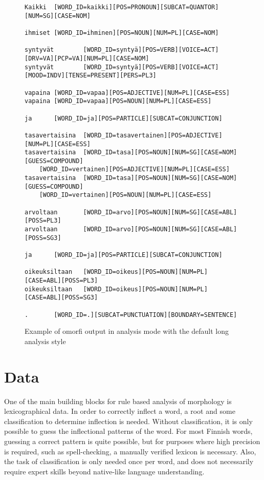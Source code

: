 \documentclass[a4paper,12pt]{article}
\begin{document}
\begin{figure}
    \begin{scriptsize}
\begin{verbatim}
Kaikki  [WORD_ID=kaikki][POS=PRONOUN][SUBCAT=QUANTOR][NUM=SG][CASE=NOM]

ihmiset [WORD_ID=ihminen][POS=NOUN][NUM=PL][CASE=NOM]

syntyvät        [WORD_ID=syntyä][POS=VERB][VOICE=ACT][DRV=VA][PCP=VA][NUM=PL][CASE=NOM]
syntyvät        [WORD_ID=syntyä][POS=VERB][VOICE=ACT][MOOD=INDV][TENSE=PRESENT][PERS=PL3]

vapaina [WORD_ID=vapaa][POS=ADJECTIVE][NUM=PL][CASE=ESS]
vapaina [WORD_ID=vapaa][POS=NOUN][NUM=PL][CASE=ESS]

ja      [WORD_ID=ja][POS=PARTICLE][SUBCAT=CONJUNCTION]

tasavertaisina  [WORD_ID=tasavertainen][POS=ADJECTIVE][NUM=PL][CASE=ESS]
tasavertaisina  [WORD_ID=tasa][POS=NOUN][NUM=SG][CASE=NOM][GUESS=COMPOUND]
    [WORD_ID=vertainen][POS=ADJECTIVE][NUM=PL][CASE=ESS]
tasavertaisina  [WORD_ID=tasa][POS=NOUN][NUM=SG][CASE=NOM][GUESS=COMPOUND]
    [WORD_ID=vertainen][POS=NOUN][NUM=PL][CASE=ESS]

arvoltaan       [WORD_ID=arvo][POS=NOUN][NUM=SG][CASE=ABL][POSS=PL3]
arvoltaan       [WORD_ID=arvo][POS=NOUN][NUM=SG][CASE=ABL][POSS=SG3]

ja      [WORD_ID=ja][POS=PARTICLE][SUBCAT=CONJUNCTION]

oikeuksiltaan   [WORD_ID=oikeus][POS=NOUN][NUM=PL][CASE=ABL][POSS=PL3]
oikeuksiltaan   [WORD_ID=oikeus][POS=NOUN][NUM=PL][CASE=ABL][POSS=SG3]

.       [WORD_ID=.][SUBCAT=PUNCTUATION][BOUNDARY=SENTENCE]
\end{verbatim}
    \end{scriptsize}
    \caption{Example of omorfi output in analysis mode with the default
        long analysis style \label{fig:output-example}}
\end{figure}


\section{Data}
\label{sec:data}

One of the main building blocks for rule based analysis of morphology is
lexicographical data. In order to correctly inflect a word, a root and some
classification to determine inflection is needed. Without classification, it is
only possible to guess the inflectional patterns of the word. For most Finnish
words, guessing a correct pattern is quite possible, but for purposes where
high precision is required, such as spell-checking, a manually verified lexicon
is necessary. Also, the task of classification is only needed once per word,
and does not necessarily require expert skills beyond native-like language
understanding.
\end{document}
